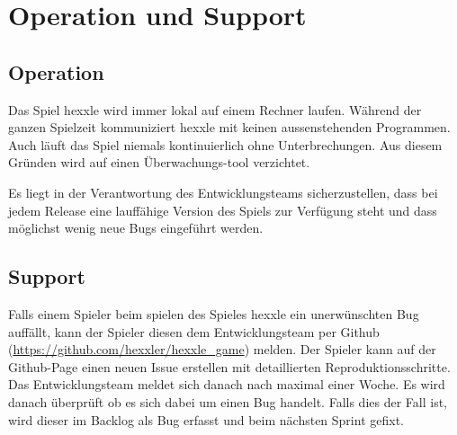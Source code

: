 \documentclass[../main.tex]{subfiles}
\begin{document}
    
    \section{Operation und Support}

    \subsection{Operation}
    \par Das Spiel \gls{hexxle} wird immer lokal auf einem Rechner laufen. Während der ganzen Spielzeit kommuniziert \gls{hexxle} mit keinen aussenstehenden Programmen. Auch läuft das Spiel niemals kontinuierlich ohne Unterbrechungen. Aus diesem Gründen wird auf einen Überwachungs-tool verzichtet. 
   
   \par Es liegt in der Verantwortung des Entwicklungsteams sicherzustellen, dass bei jedem Release eine lauffähige Version des Spiels zur Verfügung steht und dass möglichst wenig neue Bugs eingeführt werden. 

    \subsection{Support}
    \par Falls einem Spieler beim spielen des Spieles \gls{hexxle} ein unerwünschten Bug auffällt, kann der Spieler diesen dem Entwicklungsteam per Github (\url{https://github.com/hexxler/hexxle_game}) melden. Der Spieler kann auf der Github-Page einen neuen Issue erstellen mit detaillierten Reproduktionsschritte. Das Entwicklungsteam meldet sich danach nach maximal einer Woche. Es wird danach überprüft ob es sich dabei um einen Bug handelt. Falls dies der Fall ist, wird dieser im Backlog als Bug erfasst und beim nächsten Sprint gefixt. 
 
\end{document}
